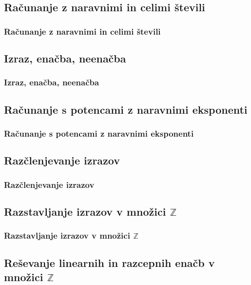         \begin{frame}

        \end{frame}


    \subsection{Računanje z naravnimi in celimi števili}

        \begin{frame}
            \frametitle{Računanje z naravnimi in celimi števili}
        \end{frame}

    \subsection{Izraz, enačba, neenačba}

        \begin{frame}
            \frametitle{Izraz, enačba, neenačba}
        \end{frame}

    \subsection{Računanje s potencami z naravnimi eksponenti}

        \begin{frame}
            \frametitle{Računanje s potencami z naravnimi eksponenti}
        \end{frame}

    \subsection{Razčlenjevanje izrazov}

        \begin{frame}
            \frametitle{Razčlenjevanje izrazov}
        \end{frame}

    \subsection{Razstavljanje izrazov v množici $\mathbb{Z}$}

        \begin{frame}
            \frametitle{Razstavljanje izrazov v množici $\mathbb{Z}$}
        \end{frame}

    \subsection{Reševanje linearnih in razcepnih enačb v množici $\mathbb{Z}$}


